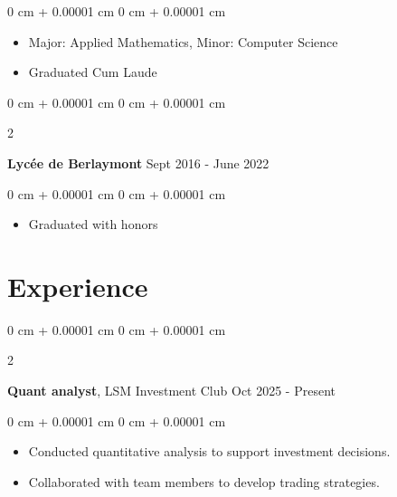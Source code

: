 \documentclass[10pt, letterpaper]{article}
\newenvironment{highlights}{
    \begin{itemize}[
        topsep=0.10 cm,
        parsep=0.10 cm,
        partopsep=0pt,
        itemsep=0pt,
        leftmargin=0 cm + 10pt
    ]
}{
    \end{itemize}
} %
\newenvironment{onecolentry}{
    \begin{adjustwidth}{
        0 cm + 0.00001 cm
    }{
        0 cm + 0.00001 cm
    }
}{
    \end{adjustwidth}
} %
\newenvironment{twocolentry}[2][]{
    \onecolentry
    \def\secondColumn{#2}
    \setcolumnwidth{\fill, 4.5 cm}
    \begin{paracol}{2}
}{
    \switchcolumn \raggedleft \secondColumn
    \end{paracol}
    \endonecolentry
} %
\begin{document}
        \vspace{0.10 cm}
        \begin{onecolentry}
            \begin{highlights}
                \item Major: Applied Mathematics, Minor: Computer Science
                \item Graduated Cum Laude
            \end{highlights}
        \end{onecolentry}
        \begin{twocolentry}{
            Sept 2016 - June 2022
        }
            \textbf{Lycée de Berlaymont}\end{twocolentry}

        \vspace{0.10 cm}
        \begin{onecolentry}
            \begin{highlights}
                \item Graduated with honors
            \end{highlights}
        \end{onecolentry}



    
    \section{Experience}



        
        \begin{twocolentry}{
            Oct 2025 - Present
        }
            \textbf{Quant analyst}, LSM Investment Club\end{twocolentry}

        \vspace{0.10 cm}
        \begin{onecolentry}
            \begin{highlights}
                \item Conducted quantitative analysis to support investment decisions.
                \item Collaborated with team members to develop trading strategies.
            \end{highlights}
        \end{onecolentry}
\end{document}
